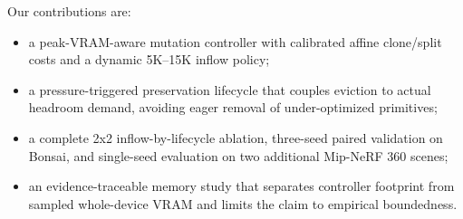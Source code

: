 Our contributions are:
\begin{itemize}
  \item a peak-VRAM-aware mutation controller with calibrated affine clone/split costs and a dynamic 5K--15K inflow policy;
  \item a pressure-triggered preservation lifecycle that couples eviction to actual headroom demand, avoiding eager removal of under-optimized primitives;
  \item a complete 2x2 inflow-by-lifecycle ablation, three-seed paired validation on Bonsai, and single-seed evaluation on two additional Mip-NeRF 360 scenes;
  \item an evidence-traceable memory study that separates controller footprint from sampled whole-device VRAM and limits the claim to empirical boundedness.
\end{itemize}
